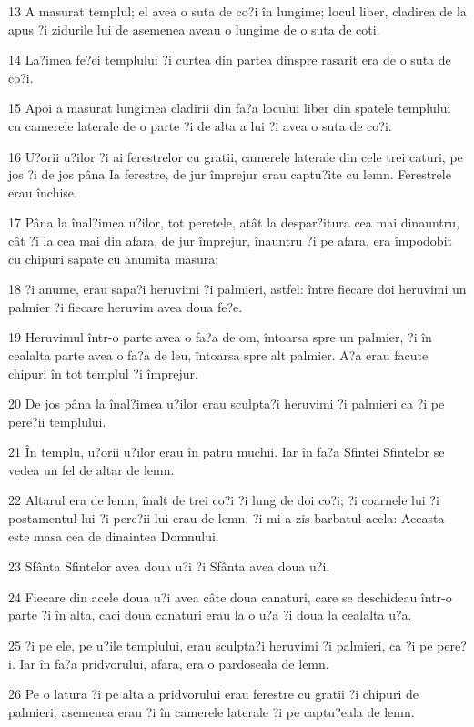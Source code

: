 \par 13 A masurat templul; el avea o suta de co?i în lungime; locul liber, cladirea de la apus ?i zidurile lui de asemenea aveau o lungime de o suta de coti.
\par 14 La?imea fe?ei templului ?i curtea din partea dinspre rasarit era de o suta de co?i.
\par 15 Apoi a masurat lungimea cladirii din fa?a locului liber din spatele templului cu camerele laterale de o parte ?i de alta a lui ?i avea o suta de co?i.
\par 16 U?orii u?ilor ?i ai ferestrelor cu gratii, camerele laterale din cele trei caturi, pe jos ?i de jos pâna Ia ferestre, de jur împrejur erau captu?ite cu lemn. Ferestrele erau închise.
\par 17 Pâna la înal?imea u?ilor, tot peretele, atât la despar?itura cea mai dinauntru, cât ?i la cea mai din afara, de jur împrejur, înauntru ?i pe afara, era împodobit cu chipuri sapate cu anumita masura;
\par 18 ?i anume, erau sapa?i heruvimi ?i palmieri, astfel: între fiecare doi heruvimi un palmier ?i fiecare heruvim avea doua fe?e.
\par 19 Heruvimul într-o parte avea o fa?a de om, întoarsa spre un palmier, ?i în cealalta parte avea o fa?a de leu, întoarsa spre alt palmier. A?a erau facute chipuri în tot templul ?i împrejur.
\par 20 De jos pâna la înal?imea u?ilor erau sculpta?i heruvimi ?i palmieri ca ?i pe pere?ii templului.
\par 21 În templu, u?orii u?ilor erau în patru muchii. Iar în fa?a Sfintei Sfintelor se vedea un fel de altar de lemn.
\par 22 Altarul era de lemn, înalt de trei co?i ?i lung de doi co?i; ?i coarnele lui ?i postamentul lui ?i pere?ii lui erau de lemn. ?i mi-a zis barbatul acela: Aceasta este masa cea de dinaintea Domnului.
\par 23 Sfânta Sfintelor avea doua u?i ?i Sfânta avea doua u?i.
\par 24 Fiecare din acele doua u?i avea câte doua canaturi, care se deschideau într-o parte ?i în alta, caci doua canaturi erau la o u?a ?i doua la cealalta u?a.
\par 25 ?i pe ele, pe u?ile templului, erau sculpta?i heruvimi ?i palmieri, ca ?i pe pere?i. Iar în fa?a pridvorului, afara, era o pardoseala de lemn.
\par 26 Pe o latura ?i pe alta a pridvorului erau ferestre cu gratii ?i chipuri de palmieri; asemenea erau ?i în camerele laterale ?i pe captu?eala de lemn.


